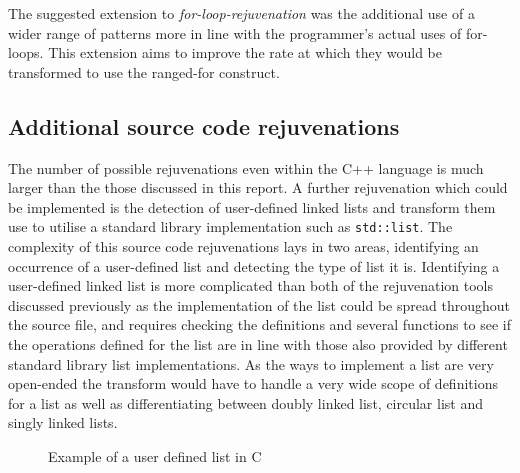 \documentclass[bsc,frontabs,singlespacing,twoside,parskip,deptreport]{infthesis}
\begin{document}
The suggested extension to \textit{for-loop-rejuvenation} was the additional use of a wider range of patterns more in line with the programmer's actual uses of for-loops. This extension aims to improve the rate at which they would be transformed to use the ranged-for construct.



\subsection{Additional source code rejuvenations}
The number of possible rejuvenations even within the C++ language is much larger than the those discussed in this report. A further rejuvenation which could be implemented is the detection of user-defined linked lists and transform them use to utilise a standard library implementation such as \texttt{std::list}. The complexity of this source code rejuvenations lays in two areas, identifying an occurrence of a user-defined list and detecting the type of list it is. Identifying a user-defined linked list is more complicated than both of the rejuvenation tools discussed previously as the implementation of the list could be spread throughout the source file, and requires checking the definitions and several functions to see if the operations defined for the list are in line with those also provided by different standard library list implementations. As the ways to implement a list are very open-ended the transform would have to handle a very wide scope of definitions for a list as well as differentiating between doubly linked list, circular list and singly linked lists.

\begin{figure}[H]
    \centering
        
    \caption{Example of a user defined list in C}
    \label{fig:user-def-list}
\end{figure}
\end{document}
